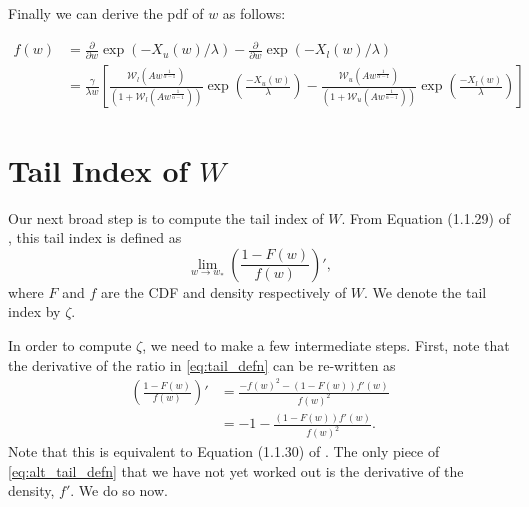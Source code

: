 \documentclass{article}
\newcommand{\sW}{\mathscr{W}}
\begin{document}
Finally we can derive the pdf of $w$ as follows: 

\begin{align}
f(w) &= \frac{\partial}{\partial w} \exp(-X_u(w)/ \lambda) - \frac{\partial}{\partial w} \exp(-X_l(w)/\lambda) \\
&= \frac{\gamma}{\lambda w} \left[ \frac{\sW_l(A w^{ \frac{1}{\alpha-1} })}{ \left( 1 + \sW_l(A w^{ \frac{1}{\alpha-1} }) \right)} \exp\left(\frac{-X_{u}(w)}{\lambda}\right) - \frac{\sW_u(A w^{ \frac{1}{\alpha-1} })}{ \left( 1 + \sW_u(A w^{ \frac{1}{\alpha-1} }) \right)}  \exp\left(\frac{-X_{l}(w)}{\lambda}\right) \right]
\end{align}

\section{Tail Index of $W$}

Our next broad step is to compute the tail index of $W$. From Equation (1.1.29) of \citet{deH06}, this tail index is defined as
%
\begin{equation}
    \lim_{w \rightarrow w_*} \left( \frac{1 - F(w)}{f(w)} \right)', \label{eq:tail_defn}
\end{equation}
%
where $F$ and $f$ are the CDF and density respectively of $W$. We denote the tail index by $\zeta$.

In order to compute $\zeta$, we need to make a few intermediate steps. First, note that the derivative of the ratio in \eqref{eq:tail_defn} can be re-written as
%
\begin{align}
    \left( \frac{1 - F(w)}{f(w)} \right)' &= \frac{-f(w)^2 - (1 - F(w)) f'(w)}{f(w)^2}\\
    &= -1 - \frac{(1 - F(w)) f'(w)}{f(w)^2}. \label{eq:alt_tail_defn}
\end{align}
%
Note that this is equivalent to Equation (1.1.30) of \citet{deH06}. The only piece of \eqref{eq:alt_tail_defn} that we have not yet worked out is the derivative of the density, $f'$. We do so now.
\end{document}
